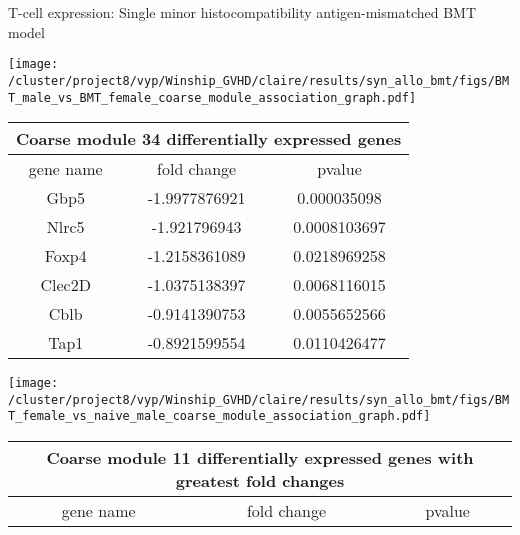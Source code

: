 \documentclass[final,hyperref={pdfpagelabels=false}]{beamer}
\begin{document}
\begin{frame}{}
\begin{columns}[t]
\begin{column}{.25\linewidth}
\begin{block}{T-cell expression: Single minor histocompatibility antigen-mismatched BMT model}
\begin{minipage}{0.45\textwidth}
            \texttt{[image: /cluster/project8/vyp/Winship\_GVHD/claire/results/syn\_allo\_bmt/figs/BMT\_male\_vs\_BMT\_female\_coarse\_module\_association\_graph.pdf]}
            \end{minipage}
{\scriptsize    \begin{tabular}{ |c|c|c| } 
	    \hline
	    \multicolumn{3}{|c|}{Coarse module 34 differentially expressed genes} \\
	      \hline
	      gene name & fold change & pvalue \\
	      \hline
	    
              Gbp5  &	-1.9977876921 &	0.000035098 \\ %
              Nlrc5 & 	-1.921796943  &	0.0008103697 \\ %
              Foxp4 &	-1.2158361089 &	0.0218969258 \\
              Clec2D& 	-1.0375138397 &	0.0068116015 \\
              Cblb  &	-0.9141390753 &	0.0055652566 \\
              Tap1  &	-0.8921599554 &	0.0110426477 \\

	      \hline
	    \end{tabular} }
          \begin{minipage}{0.45\textwidth}
            \texttt{[image: /cluster/project8/vyp/Winship\_GVHD/claire/results/syn\_allo\_bmt/figs/BMT\_female\_vs\_naive\_male\_coarse\_module\_association\_graph.pdf]}
          \end{minipage}
{\scriptsize    \begin{tabular}{ |c|c|c| } 
	    \hline
	    \multicolumn{3}{|c|}{Coarse module 11 differentially expressed genes with greatest fold changes} \\
	      \hline
	      gene name & fold change & pvalue \\
	      \hline


\end{tabular}}
\end{block}
\end{column}
\end{columns}
\end{frame}
\end{document}

